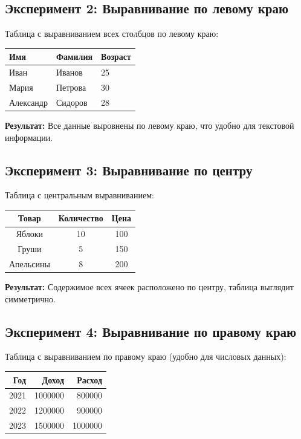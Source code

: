 \documentclass[12pt,a4paper]{article}
\begin{document}
\subsection{Эксперимент 2: Выравнивание по левому краю}

Таблица с выравниванием всех столбцов по левому краю:

\begin{center}
\begin{tabular}{|l|l|l|}
\hline
Имя & Фамилия & Возраст \\
\hline
Иван & Иванов & 25 \\
Мария & Петрова & 30 \\
Александр & Сидоров & 28 \\
\hline
\end{tabular}
\end{center}

\textbf{Результат:} Все данные выровнены по левому краю, что удобно для текстовой информации.

\subsection{Эксперимент 3: Выравнивание по центру}

Таблица с центральным выравниванием:

\begin{center}
\begin{tabular}{|c|c|c|}
\hline
Товар & Количество & Цена \\
\hline
Яблоки & 10 & 100 \\
Груши & 5 & 150 \\
Апельсины & 8 & 200 \\
\hline
\end{tabular}
\end{center}

\textbf{Результат:} Содержимое всех ячеек расположено по центру, таблица выглядит симметрично.

\subsection{Эксперимент 4: Выравнивание по правому краю}

Таблица с выравниванием по правому краю (удобно для числовых данных):

\begin{center}
\begin{tabular}{|r|r|r|}
\hline
Год & Доход & Расход \\
\hline
2021 & 1000000 & 800000 \\
2022 & 1200000 & 900000 \\
2023 & 1500000 & 1000000 \\
\hline
\end{tabular}
\end{center}
\end{document}
